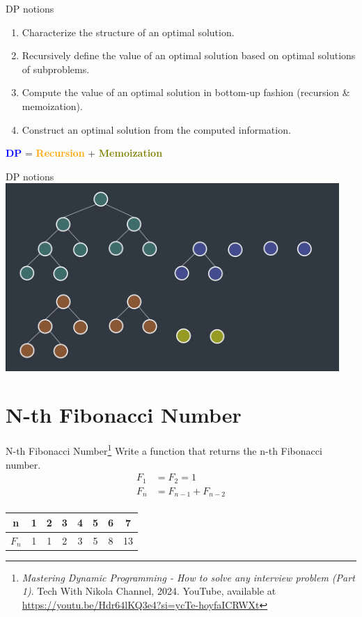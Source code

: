 \documentclass[aspectratio=169]{beamer}
\begin{document}
\begin{frame}{DP notions}
    \begin{enumerate} \pause
        \item Characterize the structure of an optimal solution. \pause
        \item Recursively deﬁne the value of an optimal solution based on optimal solutions of subproblems. \pause
        \item Compute the value of an optimal solution in bottom-up fashion (recursion \& memoization). \pause
        \item Construct an optimal solution from the computed information. \pause
    \end{enumerate}
    \vspace{10mm}
    \centering
    \Large
    \textcolor{blue}{\textbf{DP}} = \textcolor{orange}{\textbf{Recursion}} + \textcolor{olive}{\textbf{Memoization}}
\end{frame}

\begin{frame}{DP notions}
    \centering
    \includegraphics[width=0.95\textwidth]{figures/dp01.png}
\end{frame}

\section{N-th Fibonacci Number}

\begin{frame}{N-th Fibonacci Number\footnote{\scriptsize \textit{Mastering Dynamic Programming - How to solve any interview problem (Part 1)}. Tech With Nikola Channel, 2024. YouTube, available at \url{https://youtu.be/Hdr64lKQ3e4?si=ycTe-hoyfaICRWXt}}}
    Write a function that returns the n-th Fibonacci number.
    \begin{equation*}
        \begin{align*}
            F_1 &= F_2 = 1 \\
            F_n &= F_{n - 1} + F_{n - 2} \\
        \end{align*}
    \end{equation*}
    \centering
    \LARGE
    \begin{tabular}{| c | c | c | c | c | c | c | c |} \hline
        n & 1 & 2 & 3 & 4 & 5 & 6 & 7  \\ \hline
    $F_n$ & 1 & 1 & 2 & 3 & 5 & 8 & 13 \\ \hline
    \end{tabular}
\end{frame}
\end{document}
